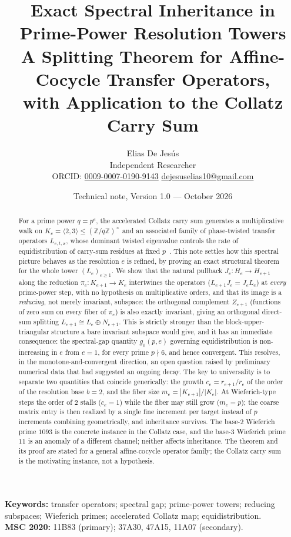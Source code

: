 \documentclass[11pt]{article}
\title{\textbf{Exact Spectral Inheritance in\\ Prime-Power Resolution Towers}\\[2pt]
\large A Splitting Theorem for Affine-Cocycle Transfer Operators,\\
with Application to the Collatz Carry Sum}
\author{Elias De Jes\'us\\[2pt]
\small Independent Researcher\\
\small ORCID: \href{https://orcid.org/0009-0007-0190-9143}{0009-0007-0190-9143}\quad
\href{mailto:dejesuselias10@gmail.com}{dejesuselias10@gmail.com}}
\date{Technical note, Version 1.0 --- October 2026}
\theoremstyle{definition}
\theoremstyle{remark}
\newcommand{\Z}{\mathbb{Z}}
\begin{document}
\maketitle

\begin{abstract}
For a prime power $q=p^e$, the accelerated Collatz carry sum generates a multiplicative walk on $K_e=\langle 2,3\rangle\le(\Z/q\Z)^\times$ and an associated family of phase-twisted transfer operators $L_{e,t,x}$, whose dominant twisted eigenvalue controls the rate of equidistribution of carry-sum residues at fixed $p$~\cite{DJ-fixedprime}. This note settles how this spectral picture behaves as the resolution $e$ is refined, by proving an exact structural theorem for the whole tower $(L_e)_{e\ge1}$. We show that the natural pullback $J_e:H_e\to H_{e+1}$ along the reduction $\pi_e:K_{e+1}\to K_e$ intertwines the operators ($L_{e+1}J_e=J_eL_e$) at \emph{every} prime-power step, with no hypothesis on multiplicative orders, and that its image is a \emph{reducing}, not merely invariant, subspace: the orthogonal complement $Z_{e+1}$ (functions of zero sum on every fiber of $\pi_e$) is also exactly invariant, giving an orthogonal direct-sum splitting $L_{e+1}\cong L_e\oplus N_{e+1}$. This is strictly stronger than the block-upper-triangular structure a bare invariant subspace would give, and it has an immediate consequence: the spectral-gap quantity $g_0(p,e)$ governing equidistribution is non-increasing in $e$ from $e=1$, for every prime $p\nmid 6$, and hence convergent. This resolves, in the monotone-and-convergent direction, an open question raised by preliminary numerical data that had suggested an ongoing decay. The key to universality is to separate two quantities that coincide generically: the growth $c_e=r_{e+1}/r_e$ of the order of the resolution base $b=2$, and the fiber size $m_e=|K_{e+1}|/|K_e|$. At Wieferich-type steps the order of $2$ stalls ($c_e=1$) while the fiber may still grow ($m_e=p$); the coarse matrix entry is then realized by a single fine increment per target instead of $p$ increments combining geometrically, and inheritance survives. The base-2 Wieferich prime $1093$ is the concrete instance in the Collatz case, and the base-3 Wieferich prime $11$ is an anomaly of a different channel; neither affects inheritance. The theorem and its proof are stated for a general affine-cocycle operator family; the Collatz carry sum is the motivating instance, not a hypothesis.
\end{abstract}

\medskip
\noindent\textbf{Keywords:} transfer operators; spectral gap; prime-power towers; reducing subspaces; Wieferich primes; accelerated Collatz map; equidistribution.\\
\textbf{MSC 2020:} 11B83 (primary); 37A30, 47A15, 11A07 (secondary).
\end{document}

